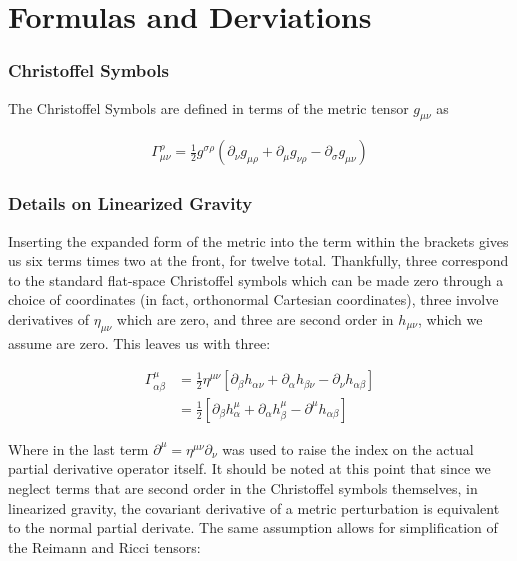\chapter{Formulas and Derviations}\label{Appendix C}

\subsection{Christoffel Symbols}

The Christoffel Symbols are defined in terms of the metric tensor $g_{\mu \nu}$ as 

\begin{align}
\Gamma^{\rho}_{\mu \nu} = \frac{1}{2}g^{\sigma \rho}(\partial_{\nu}g_{\mu \rho} + \partial_{\mu}g_{\nu \rho} - \partial_{\sigma}g_{\mu \nu})
\end{align}

\clearpage
\newpage

\subsection{Details on Linearized Gravity}
Inserting the expanded form of the metric into the term within the brackets gives us six terms times two at the front, for twelve total. Thankfully, three correspond to the standard flat-space Christoffel symbols which can be made zero through a choice of coordinates (in fact, orthonormal Cartesian coordinates), three involve derivatives of $\eta_{\mu \nu}$ which are zero, and three are second order in $h_{\mu \nu}$, which we assume are zero. This leaves us with three:

\begin{align}\label{eq:linchrist}
\Gamma^{\mu}_{\alpha \beta} &= \frac{1}{2}\eta^{\mu \nu}\left[\partial_{\beta}h_{\alpha \nu} + \partial_{\alpha} h_{\beta \nu} - \partial_{\nu}h_{\alpha \beta}\right] \\
&= \frac{1}{2} \left[\partial_{\beta} h^{\mu}_{\alpha} + \partial_{\alpha}h_{\beta}^{\mu} - \partial^{\mu}h_{\alpha \beta}\right] 
\end{align} 

Where in the last term $\partial^{\mu} = \eta^{\mu \nu}\partial_{\nu}$ was used to raise the index on the actual partial derivative operator itself. It should be noted at this point that since we neglect terms that are second order in the Christoffel symbols themselves, in linearized gravity, the covariant derivative of a metric perturbation is equivalent to the normal partial derivate. The same assumption allows for simplification of the Reimann and Ricci tensors:

